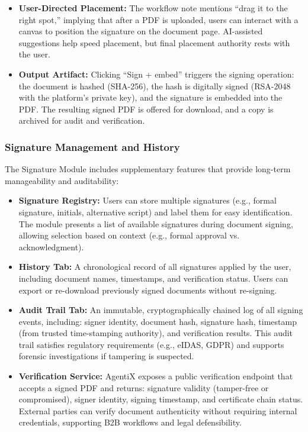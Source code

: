 \documentclass[12pt,oneside,openright,a4paper]{cpe-english-project}
\begin{document}
\begin{itemize}
\item \textbf{User-Directed Placement:} The workflow note mentions ``drag it to the right spot,'' implying that after a PDF is uploaded, users can interact with a canvas to position the signature on the document page. AI-assisted suggestions help speed placement, but final placement authority rests with the user.

\item \textbf{Output Artifact:} Clicking ``Sign + embed'' triggers the signing operation: the document is hashed (SHA-256), the hash is digitally signed (RSA-2048 with the platform's private key), and the signature is embedded into the PDF. The resulting signed PDF is offered for download, and a copy is archived for audit and verification.
\end{itemize}

\subsubsection{Signature Management and History}

The Signature Module includes supplementary features that provide long-term manageability and auditability:

\begin{itemize}
\item \textbf{Signature Registry:} Users can store multiple signatures (e.g., formal signature, initials, alternative script) and label them for easy identification. The module presents a list of available signatures during document signing, allowing selection based on context (e.g., formal approval vs. acknowledgment).

\item \textbf{History Tab:} A chronological record of all signatures applied by the user, including document names, timestamps, and verification status. Users can export or re-download previously signed documents without re-signing.

\item \textbf{Audit Trail Tab:} An immutable, cryptographically chained log of all signing events, including: signer identity, document hash, signature hash, timestamp (from trusted time-stamping authority), and verification results. This audit trail satisfies regulatory requirements (e.g., eIDAS, GDPR) and supports forensic investigations if tampering is suspected.

\item \textbf{Verification Service:} AgentiX exposes a public verification endpoint that accepts a signed PDF and returns: signature validity (tamper-free or compromised), signer identity, signing timestamp, and certificate chain status. External parties can verify document authenticity without requiring internal credentials, supporting B2B workflows and legal defensibility.
\end{itemize}
\end{document}
